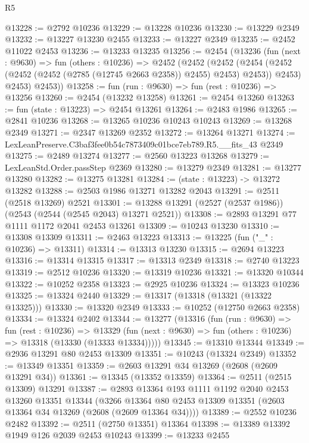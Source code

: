 \begin{lexlean}{R5}
\begin{coremodule}
@13228 := @2792 @10236
@13229 := @13228 @10236
@13230 := @13229 @2349
@13232 := @13227 @13230 @2455
@13233 := @13227 @2349
@13235 := @2452 @11022 @2453
@13236 := @13233 @13235
@13256 := @2454
    (@13236
      (fun (next : @9630) =>
      fun (others : @10236) =>
      @2452
        (@2452
          (@2452
            (@2454 (@2452 (@2452 (@2452 (@2785 (@12745 @2663 @2358)) @2455) @2453) @2453))
            @2453)
          @2453)
        @2453))
@13258 := fun (run : @9630) => fun (rest : @10236) => @13256
@13260 := @2454 (@13232 @13258)
@13261 := @2454 @13260
@13263 := fun (state : @13223) => @2454 @13261
@13264 := @2483 @1986
@13265 := @2841 @10236
@13268 := @13265 @10236 @10243 @10243
@13269 := @13268 @2349
@13271 := @2347 @13269 @2352
@13272 := @13264 @13271
@13274 := LexLeanPreserve.C3baf3fee0b54c7873409c01bce7eb789.R5.__fits_43 @2349
@13275 := @2489 @13274
@13277 := @2560 @13223 @13268
@13279 := LexLeanStd.Order.passStep @2369
@13280 := @13279 @2349
@13281 := @13277 @13280
@13282 := @13275 @13281
@13284 := (state : @13223) -> @13272 @13282
@13288 := @2503 @1986 @13271 @13282 @2043
@13291 := @2511 (@2518 @13269) @2521
@13301 := @13288 @13291 (@2527 (@2537 @1986)) (@2543 (@2544 (@2545 @2043) @13271 @2521))
@13308 := @2893 @13291 @77 @1111 @1172 @2041 @2453 @13261
@13309 := @10243 @13230
@13310 := @13308 @13309
@13311 := @2463 @13223
@13313 := @13225 (fun ("_" : @10236) => @13311)
@13314 := @13313 @13230
@13315 := @2694 @13223
@13316 := @13314 @13315
@13317 := @13313 @2349
@13318 := @2740 @13223
@13319 := @2512 @10236
@13320 := @13319 @10236
@13321 := @13320 @10344
@13322 := @10252 @2358
@13323 := @2925 @10236
@13324 := @13323 @10236
@13325 := @13324 @2440
@13329 := @13317 (@13318 (@13321 (@13322 @13325)))
@13330 := @13320 @2349
@13333 := @10252 (@12750 @2663 @2358)
@13334 := @13324 @2402
@13344 := @13277
    (@13316
      (fun (run : @9630) =>
      fun (rest : @10236) =>
      @13329 (fun (next : @9630) => fun (others : @10236) => @13318 (@13330 (@13333 @13334)))))
@13345 := @13310 @13344
@13349 := @2936 @13291 @80 @2453 @13309
@13351 := @10243 (@13324 @2349)
@13352 := @13349 @13351
@13359 := @2603 @13291 @34 @13269 (@2608 (@2609 @13291 @34))
@13361 := @13345 (@13352 @13359)
@13364 := @2511 (@2515 @13309) @13291
@13387 := @2893
    @13364
    @193
    @1111
    @1192
    @2040
    @2453
    @13260
    @13351
    @13344
    (@3266 @13364 @80 @2453 @13309 @13351 (@2603 @13364 @34 @13269 (@2608 (@2609 @13364 @34))))
@13389 := @2552 @10236 @2482
@13392 := @2511 (@2750 @13351) @13364
@13398 := @13389 @13392 @1949 @126 @2039 @2453 @10243
@13399 := @13233 @2455

\end{coremodule}
\end{lexlean}
